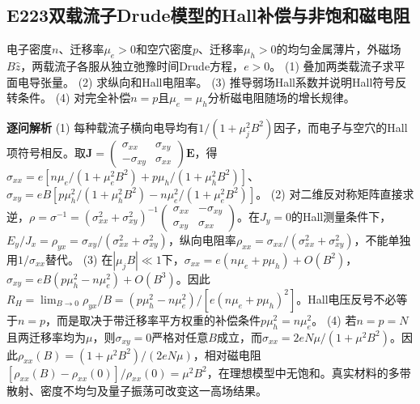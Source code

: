 \subsection*{E223\quad 双载流子Drude模型的Hall补偿与非饱和磁电阻}
电子密度$n$、迁移率$\mu_e>0$和空穴密度$p$、迁移率$\mu_h>0$的均匀金属薄片，外磁场$B\hat z$，两载流子各服从独立弛豫时间Drude方程，$e>0$。
(1) 叠加两类载流子求平面电导张量。
(2) 求纵向和Hall电阻率。
(3) 推导弱场Hall系数并说明Hall符号反转条件。
(4) 对完全补偿$n=p$且$\mu_e=\mu_h$分析磁电阻随场的增长规律。
\par\textbf{逐问解析}
(1) 每种载流子横向电导均有$1/(1+\mu_j^2B^2)$因子，而电子与空穴的Hall项符号相反。取$\mathbf J=\begin{pmatrix}\sigma_{xx}&\sigma_{xy}\\-\sigma_{xy}&\sigma_{xx}\end{pmatrix}\mathbf E$，得$\sigma_{xx}=e[n\mu_e/(1+\mu_e^2B^2)+p\mu_h/(1+\mu_h^2B^2)]$、$\sigma_{xy}=eB[p\mu_h^2/(1+\mu_h^2B^2)-n\mu_e^2/(1+\mu_e^2B^2)]$。
(2) 对二维反对称矩阵直接求逆，$\rho=\sigma^{-1}=(\sigma_{xx}^2+\sigma_{xy}^2)^{-1}\begin{pmatrix}\sigma_{xx}&-\sigma_{xy}\\\sigma_{xy}&\sigma_{xx}\end{pmatrix}$。在$J_y=0$的Hall测量条件下，$E_y/J_x=\rho_{yx}=\sigma_{xy}/(\sigma_{xx}^2+\sigma_{xy}^2)$，纵向电阻率$\rho_{xx}=\sigma_{xx}/(\sigma_{xx}^2+\sigma_{xy}^2)$，不能单独用$1/\sigma_{xx}$替代。
(3) 在$|\mu_jB|\ll1$下，$\sigma_{xx}=e(n\mu_e+p\mu_h)+O(B^2)$，$\sigma_{xy}=eB(p\mu_h^2-n\mu_e^2)+O(B^3)$。因此$R_H=\lim_{B\to0}\rho_{yx}/B=(p\mu_h^2-n\mu_e^2)/[e(n\mu_e+p\mu_h)^2]$。Hall电压反号不必等于$n=p$，而是取决于带迁移率平方权重的补偿条件$p\mu_h^2=n\mu_e^2$。
(4) 若$n=p=N$且两迁移率均为$\mu$，则$\sigma_{xy}=0$严格对任意$B$成立，而$\sigma_{xx}=2eN\mu/(1+\mu^2B^2)$。因此$\rho_{xx}(B)=(1+\mu^2B^2)/(2eN\mu)$，相对磁电阻$[\rho_{xx}(B)-\rho_{xx}(0)]/\rho_{xx}(0)=\mu^2B^2$，在理想模型中无饱和。真实材料的多带散射、密度不均匀及量子振荡可改变这一高场结果。
\par\medskip
